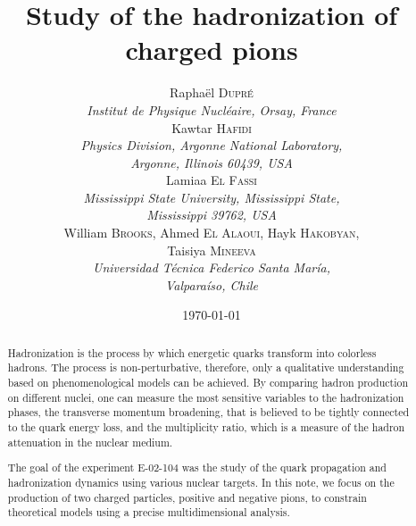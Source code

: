 \documentclass[a4paper,12pt,twoside]{article}
\title{Study of the hadronization of charged pions}
\author{
  Rapha\"el \textsc{Dupr\'e} \\ 
  {\it Institut de Physique Nucl\'eaire, Orsay, France} \\
  Kawtar \textsc{Hafidi} \\ 
  {\it Physics Division, Argonne National Laboratory,} \\ 
  {\it Argonne, Illinois 60439, USA} \\
  Lamiaa \textsc{El Fassi} \\ 
  {\it Mississippi State University, Mississippi State,} \\ 
  {\it Mississippi 39762, USA} \\
  William \textsc{Brooks}, Ahmed \textsc{El Alaoui}, Hayk \textsc{Hakobyan}, \\
  Taisiya \textsc{Mineeva} \\
  {\it Universidad T\'ecnica Federico Santa Mar\'ia,} \\ 
  {\it Valpara\'iso, Chile} 
}
\date{\today}
\begin{document}
\maketitle

\renewcommand{\baselinestretch}{1.10}

\begin{abstract}
Hadronization is the process by which energetic quarks transform into colorless 
hadrons. The process is non-perturbative, therefore, only a qualitative 
understanding based on phenomenological models can be achieved. By comparing 
hadron production on different nuclei, one can measure the most sensitive variables 
to the hadronization phases, the transverse momentum broadening, that is believed 
to be tightly connected to the quark energy loss, and the multiplicity ratio, 
which is a measure of the hadron attenuation in the nuclear medium.

The goal of the experiment E-02-104 was the study of the quark propagation and 
hadronization dynamics using various nuclear targets. In this note, we focus 
on the production of two charged particles, positive and negative pions, to 
constrain theoretical models using a precise multidimensional analysis.

\end{abstract}

\newpage

\tableofcontents

\newpage









\end{document}
